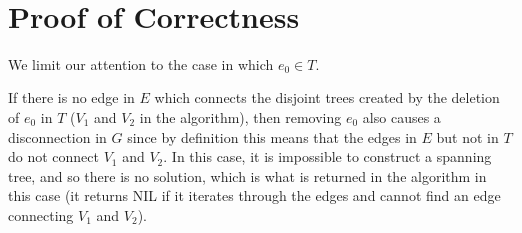 \documentclass[a4paper,twoside,10pt]{report}
\newcommand{\marginline}{\noindent\makebox[\linewidth][r]{\rule{\textwidth}{1pt}}}
\newcommand{\exer}[1]{\noindent{\Large\textsc{Question #1}} \\ \marginline}
\newenvironment{exercise}[1]{\exer{#1}}{}
\begin{document}
\begin{exercise}{1b}
\section{Proof of Correctness}

We limit our attention to the case in which $e_0 \in T$. 

If there is no edge in $E$ which connects the disjoint trees created by the deletion of $e_0$ in $T$ ($V_1$ and $V_2$ in the algorithm), then removing $e_0$ also causes a disconnection in $G$ since by definition this means that the edges in $E$ but not in $T$ do not connect $V_1$ and $V_2$. In this case, it is impossible to construct a spanning tree, and so there is no solution, which is what is returned in the algorithm in this case (it returns NIL if it iterates through the edges and cannot find an edge connecting $V_1$ and $V_2$).



\end{exercise}
\end{document}
